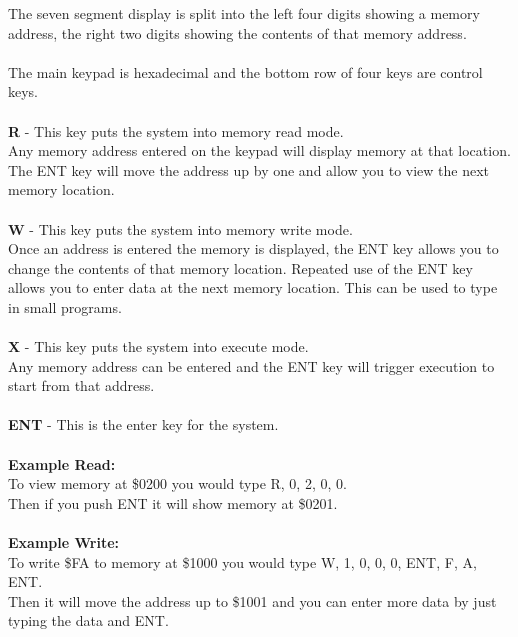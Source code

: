 \documentclass{ol-softwaremanual}
\begin{document}
The seven segment display is split into the left four digits showing a memory address, the right two digits showing the contents of that memory address.\\
\\
The main keypad is hexadecimal and the bottom row of four keys are control keys.\\
\\
\textbf{R} - This key puts the system into memory read mode.\\
Any memory address entered on the keypad will display memory at  that location. The ENT key will move the address up by one and allow you to view the next memory location.\\
\\
\textbf{W} - This key puts the system into memory write mode.\\
Once an address is entered the memory is displayed, the ENT key allows you to change the contents of that memory location. Repeated use of the ENT key allows you to enter data at the next memory location.  This can be used to type in small programs.\\
\\
\textbf{X} - This key puts the system into execute mode.\\
Any memory address can be entered and the ENT key will trigger execution to start from that address.\\
\\
\textbf{ENT} - This is the enter key for the system.\\
\\
\textbf{Example Read:}\\
To view memory at \$0200 you would type R, 0, 2, 0, 0.\\
Then if you push ENT it will show memory at \$0201.\\
\\
\textbf{Example Write:}\\
To write \$FA to memory at \$1000 you would type W, 1, 0, 0, 0, ENT, F, A, ENT.\\
Then it will move the address up to \$1001 and you can enter more data by just typing the data and ENT.\\

\pagebreak
\end{document}
